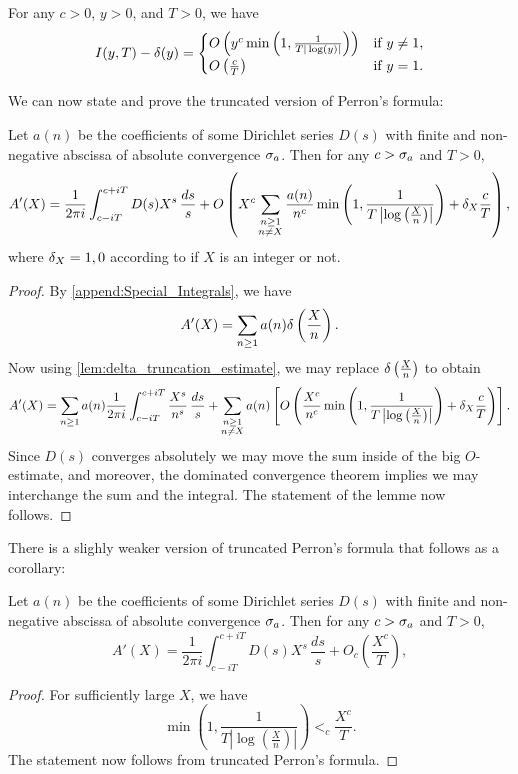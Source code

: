       \begin{lemma}\label{lem:delta_truncation_estimate}
        For any $c > 0$, $y > 0$, and $T > 0$, we have
        \[
          I(y,T)-\delta(y) = \begin{cases} O\left(y^{c}\min\left(1,\frac{1}{T|\log(y)|}\right)\right) & \text{if $y \neq 1$}, \\ O\left(\frac{c}{T}\right) & \text{if $y = 1$}. \end{cases}
        \]
      \end{lemma}

      We can now state and prove the truncated version of Perron's formula:

      \begin{theorem}
        Let $a(n)$ be the coefficients of some Dirichlet series $D(s)$ with finite and non-negative abscissa of absolute convergence $\sigma_{a}$. Then for any $c > \sigma_{a}$ and $T > 0$,
        \[
          A'(X) = \frac{1}{2\pi i}\int_{c-iT}^{c+iT}D(s)X^{s}\,\frac{ds}{s}+O\left(X^{c}\sum_{\substack{n \ge 1 \\ n \neq X}}\frac{a(n)}{n^{c}}\min\left(1,\frac{1}{T\left|\log\left(\frac{X}{n}\right)\right|}\right)+\delta_{X}\frac{c}{T}\right),
        \]
        where $\delta_{X} = 1,0$ according to if $X$ is an integer or not.
      \end{theorem}
      \begin{proof}
        By \cref{append:Special_Integrals}, we have
        \[
          A'(X) = \sum_{n \ge 1}a(n)\delta\left(\frac{X}{n}\right).
        \]
        Now using \cref{lem:delta_truncation_estimate}, we may replace $\delta\left(\frac{X}{n}\right)$ to obtain
        \[
          A'(X) = \sum_{n \ge 1}a(n)\frac{1}{2\pi i}\int_{c-iT}^{c+iT}\frac{X^{s}}{n^{s}}\,\frac{ds}{s}+\sum_{\substack{n \ge 1 \\ n \neq X}}a(n)\left[O\left(\frac{X^{c}}{n^{c}}\min\left(1,\frac{1}{T\left|\log\left(\frac{X}{n}\right)\right|}\right)+\delta_{X}\frac{c}{T}\right)\right].
        \]
        Since $D(s)$ converges absolutely we may move the sum inside of the big $O$-estimate, and moreover, the dominated convergence theorem implies we may interchange the sum and the integral. The statement of the lemme now follows.
      \end{proof}

      There is a slighly weaker version of truncated Perron's formula that follows as a corollary:

      \begin{corollary}
        Let $a(n)$ be the coefficients of some Dirichlet series $D(s)$ with finite and non-negative abscissa of absolute convergence $\sigma_{a}$. Then for any $c > \sigma_{a}$ and $T > 0$,
        \[
          A'(X) = \frac{1}{2\pi i}\int_{c-iT}^{c+iT}D(s)X^{s}\,\frac{ds}{s}+O_{c}\left(\frac{X^{c}}{T}\right),
        \]
      \end{corollary}
      \begin{proof}
        For sufficiently large $X$, we have
        \[
          \min\left(1,\frac{1}{T\left|\log\left(\frac{X}{n}\right)\right|}\right) <_{c} \frac{X^{c}}{T}.
        \]
        The statement now follows from truncated Perron's formula.
      \end{proof}

